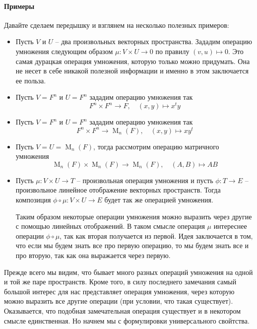 \paragraph{Примеры}
Давайте сделаем передышку и взглянем на несколько полезных примеров:
\begin{itemize}
\item Пусть $V$ и $U$ -- два произвольных векторных пространства. Зададим операцию умножения следующим образом $\mu\colon V\times U \to 0$ по правилу $(v, u) \mapsto 0$. Это самая дурацкая операция умножения, которую только можно придумать. Она не несет в себе никакой полезной информации и именно в этом заключается ее польза.

\item Пусть $V = F^n$ и $U = F^n$ зададим операцию умножения так
\[
F^n \times F^n \to F,\quad (x, y) \mapsto x^t y
\]

\item Пусть $V = F^n$ и $U = F^n$ зададим операцию умножения так
\[
F^n \times F^n \to \operatorname{M}_{n}(F),\quad (x, y)\mapsto xy^t
\]

\item Пусть $V = U= \operatorname{M}_n(F)$, тогда рассмотрим операцию матричного умножения
\[
\operatorname{M}_n(F)\times \operatorname{M}_n(F)\to \operatorname{M}_n(F),\quad (A, B)\mapsto AB
\]

\item Пусть $\mu \colon V\times U\to T$ -- произвольная операция умножения и пусть $\phi \colon T\to E$ -- произвольное линейное отображение векторных пространств. Тогда композиция $\phi\circ \mu \colon V\times U \to E$ будет так же операцией умножения.


Таким образом некоторые операции умножения можно выразить через другие с помощью линейных отображений. В таком смысле операция $\mu$ интереснее операции $\phi \circ \mu$, так как вторая получается из первой. Идея заключается в том, что если мы будем знать все про первую операцию, то мы будем знать все и про вторую, так как она выражается через первую.
\end{itemize}

Прежде всего мы видим, что бывает много разных операций умножения на одной и той же паре пространств. Кроме того, в силу последнего замечания самый большой интерес для нас представляет операция умножения, через которую можно выразить все другие операции (при условии, что такая существует). Оказывается, что подобная замечательная операция существует и в некотором смысле единственная. Но начнем мы с формулировки универсального свойтства.


